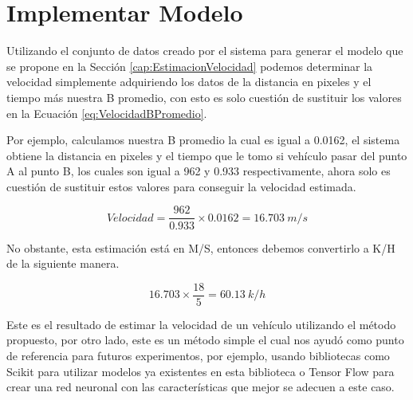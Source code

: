 \section{Implementar Modelo}

Utilizando el conjunto de datos creado por el sistema para generar el modelo que se propone en la Sección \ref{cap:EstimacionVelocidad} podemos determinar la velocidad simplemente adquiriendo los datos de la distancia en pixeles y el tiempo más nuestra B promedio, con esto es solo cuestión de sustituir los valores en la Ecuación \ref{eq:VelocidadBPromedio}.

Por ejemplo, calculamos nuestra B promedio la cual es igual a 0.0162, el sistema obtiene la distancia en pixeles y el tiempo que le tomo si vehículo pasar del punto A al punto B, los cuales son igual a 962 y 0.933 respectivamente, ahora solo es cuestión de sustituir estos valores para conseguir la velocidad estimada.

\begin{equation}
    \label{eq:EjemploImplementacion}
    Velocidad = \frac{962 }{0.933} \times 0.0162 = 16.703 \: m/s
\end{equation}


No obstante, esta estimación está en M/S, entonces debemos convertirlo a K/H de la siguiente manera.

\begin{equation}
    \label{eq:EjmploKH}
     16.703\times \frac{18}{5} = 60.13 \: k/h
\end{equation}

Este es el resultado de estimar la velocidad de un vehículo utilizando el método propuesto, por otro lado, este es un método simple el cual nos ayudó como punto de referencia para futuros experimentos, por ejemplo, usando bibliotecas como Scikit para utilizar modelos ya existentes en esta biblioteca o Tensor Flow para crear una red neuronal con las características que mejor se adecuen a este caso.
